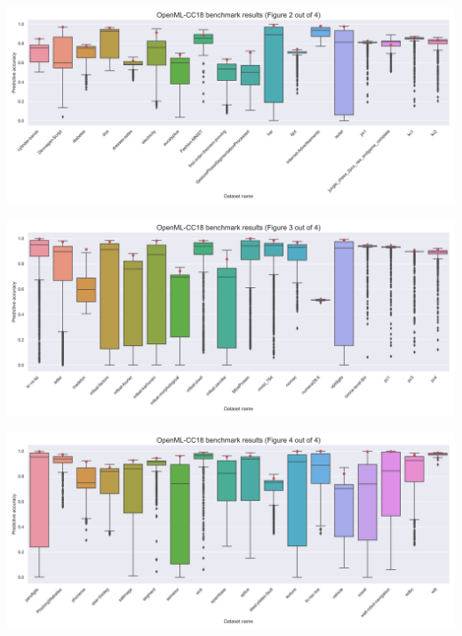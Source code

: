 \documentclass[a0paper,portrait]{baposter}
\begin{document}
\begin{poster}
{\begin{minipage}{.5\textwidth}
\end{minipage}%
\begin{minipage}{.5\textwidth}
  \centering
  \includegraphics[width=0.9\linewidth]{../img/openml-boxplot1-hdpi.png}

\end{minipage}

\vspace{0.5em}

\begin{minipage}{.5\textwidth}
  \centering
  \includegraphics[width=0.9\linewidth]{../img/openml-boxplot2-hdpi.png}

\end{minipage}%
\begin{minipage}{.5\textwidth}
  \centering
  \includegraphics[width=0.9\linewidth]{../img/openml-boxplot3-hdpi.png}

\end{minipage}
}

\end{poster}
\end{document}
